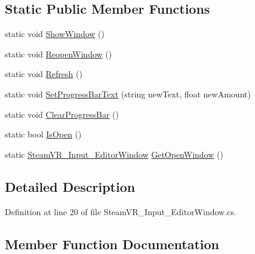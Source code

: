 \subsection*{Static Public Member Functions}
\begin{DoxyCompactItemize}
\item 
static void \mbox{\hyperlink{class_valve_1_1_v_r_1_1_steam_v_r___input___editor_window_a6c00ad119684854607a322588bc46c0b}{Show\+Window}} ()
\item 
static void \mbox{\hyperlink{class_valve_1_1_v_r_1_1_steam_v_r___input___editor_window_a6ce5ae54a9d801271f2a7fd335635773}{Reopen\+Window}} ()
\item 
static void \mbox{\hyperlink{class_valve_1_1_v_r_1_1_steam_v_r___input___editor_window_a9d642f474ed2b993e18f92f728d7f166}{Refresh}} ()
\item 
static void \mbox{\hyperlink{class_valve_1_1_v_r_1_1_steam_v_r___input___editor_window_a2636f1bb7d713478c9660b1f0a183380}{Set\+Progress\+Bar\+Text}} (string new\+Text, float new\+Amount)
\item 
static void \mbox{\hyperlink{class_valve_1_1_v_r_1_1_steam_v_r___input___editor_window_aec0d44ea05fb8b8141706ffebfe3ab74}{Clear\+Progress\+Bar}} ()
\item 
static bool \mbox{\hyperlink{class_valve_1_1_v_r_1_1_steam_v_r___input___editor_window_a36197010225a2eb134a03d9ea099a907}{Is\+Open}} ()
\item 
static \mbox{\hyperlink{class_valve_1_1_v_r_1_1_steam_v_r___input___editor_window}{Steam\+V\+R\+\_\+\+Input\+\_\+\+Editor\+Window}} \mbox{\hyperlink{class_valve_1_1_v_r_1_1_steam_v_r___input___editor_window_af0349180cfb189626f90a5f8c8205d17}{Get\+Open\+Window}} ()
\end{DoxyCompactItemize}


\subsection{Detailed Description}


Definition at line 20 of file Steam\+V\+R\+\_\+\+Input\+\_\+\+Editor\+Window.\+cs.



\subsection{Member Function Documentation}
\mbox{\label{class_valve_1_1_v_r_1_1_steam_v_r___input___editor_window_aec0d44ea05fb8b8141706ffebfe3ab74}} 
